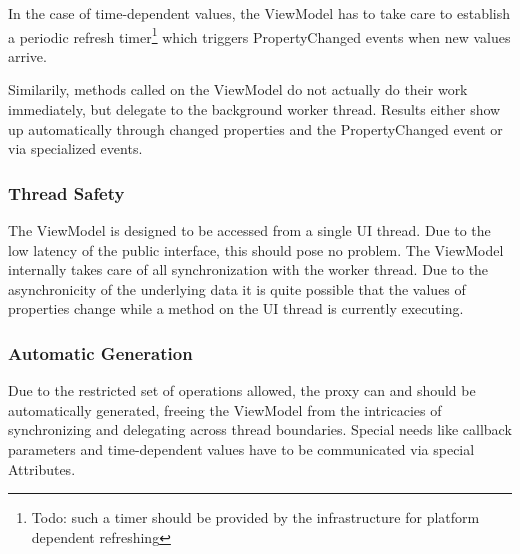 In the case of time-dependent values, the ViewModel has to take care
to establish a periodic refresh timer\footnote{Todo: such a timer should be
provided by the infrastructure for platform dependent refreshing} which
triggers PropertyChanged events when new values arrive.

Similarily, methods called on the ViewModel do not actually do their work
immediately, but delegate to the background worker thread. Results either show
up automatically through changed properties and the PropertyChanged event or
via specialized events.

\subsubsection{Thread Safety}

The ViewModel is designed to be accessed from a single UI thread. Due to the
low latency of the public interface, this should pose no problem. The ViewModel
internally takes care of all synchronization with the worker thread. Due to the
asynchronicity of the underlying data it is quite possible that the values of
properties change while a method on the UI thread is currently executing.

\subsubsection{Automatic Generation}

Due to the restricted set of operations allowed, the proxy can and should be
automatically generated, freeing the ViewModel from the intricacies of
synchronizing and delegating across thread boundaries. Special needs like
callback parameters and time-dependent values have to be communicated via
special Attributes.

